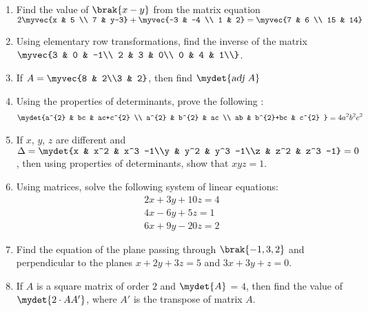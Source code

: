 \begin{enumerate}
\item Find the value of $\brak{x-y}$ from the matrix equation $2\myvec{x & 5 \\ 7 & y-3} + \myvec{-3 & -4 \\ 1 & 2}= \myvec{7 & 6 \\ 15 & 14}$

\item Using elementary row transformations, find the inverse of the matrix $\myvec{3 & 0 & -1\\
	2 & 3 & 0\\
	0 & 4 & 1\\}$.

\item If $A =\myvec{8 & 2\\3 & 2}$, then find $\mydet{\textsl{adj}~A}$

\item Using the properties of determinants, prove the following :
    \begin{align*}
    \mydet{a^{2} & bc & ac+c^{2} \\ a^{2} & b^{2} & ac \\ ab & b^{2}+bc & c^{2} } = 4a^{2}b^{2}c^{2} 
    \end{align*}

 \item If $x$, $y$, $z$ are different and $\Delta=\mydet{x & x^2 & x^3 -1\\y & y^2 & y^3 -1\\z & z^2 & z^3 -1} = 0$, then using properties of determinants, show that $xyz = 1$.

\item Using matrices, solve the following system of linear equations:
 \begin{align*}
  2x+3y+10z=4\\
  4x-6y+5z=1\\
  6x+9y-20z=2
 \end{align*}

\item Find the equation of the plane passing through $\brak{-1,3,2}$ and perpendicular to the planes $x+2y+3z=5$ and $3x+3y+z=0$.

\item If $A$ is a square matrix of order $2$ and $\mydet{A}$ = $4$, then find the value of $\mydet{2\cdot AA'}$, where $A'$ is the transpose of matrix $A$.
\end{enumerate}
